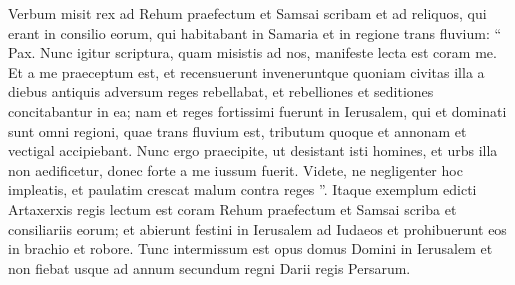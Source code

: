 \begin{biblechapter}
\begin{biblechapter}
\begin{biblechapter}
\begin{biblechapter}
 \verse Verbum misit rex ad Rehum praefectum et Samsai scribam et ad reliquos, qui erant in consilio eorum, qui habitabant in Samaria et in regione trans fluvium: “ Pax. Nunc igitur scriptura, 
\verse quam misistis ad nos, manifeste lecta est coram me. 
\verse Et a me praeceptum est, et recensuerunt inveneruntque quoniam civitas illa a diebus antiquis adversum reges rebellabat, et rebelliones et seditiones concitabantur in ea; 
\verse nam et reges fortissimi fuerunt in Ierusalem, qui et dominati sunt omni regioni, quae trans fluvium est, tributum quoque et annonam et vectigal accipiebant. 
\verse Nunc ergo praecipite, ut desistant isti homines, et urbs illa non aedificetur, donec forte a me iussum fuerit. 
\verse Videte, ne negligenter hoc impleatis, et paulatim crescat malum contra reges ”.
 \verse Itaque exemplum edicti Artaxerxis regis lectum est coram Rehum praefectum et Samsai scriba et consiliariis eorum; et abierunt festini in Ierusalem ad Iudaeos et prohibuerunt eos in brachio et robore. 
\verse Tunc intermissum est opus domus Domini in Ierusalem et non fiebat usque ad annum secundum regni Darii regis Persarum.
 

\end{biblechapter}
\end{biblechapter}
\end{biblechapter}
\end{biblechapter}
